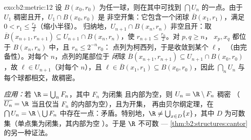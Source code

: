 \begin{solution}{exo:b2:metric:12}
设 $B(x_0, r_0)$ 为任一球，则在其中可找到 $\bigcap U_n$
的一点。由于 $U_1$ 稠密且开，$U_1 \cap B(x_0, r_0)$ 是
非空开集：它包含一个闭球 $\overline B(x_1,
r_1)$，满足 $0 < r_1 \leq \frac{r_0}2$（缩小半径）。
归纳地，$U_{n+1} \cap B(x_n, r_n)$ 非空且开：取
$\overline B(x_{n+1}, r_{n+1}) \subseteq U_{n+1} \cap B(x_n,
r_n)$，使 $r_{n+1} \leq \frac{r_n}2$。对 $p, q \geq n$，
$x_p, x_q$ 都位于 $B(x_n, r_n)$ 中，且 $r_n \leq 2^{-n}r_0$：
点列为柯西列，于是收敛到某个 $\ell$，
（由完备性）。对每个 $n$，点列的尾部位于
\emph{闭}球 $\overline B(x_{n+1}, r_{n+1}) \subseteq U_{n+1}
\cap B(x_0, r_0)$，故 $\ell \in U_{n+1}$（对每个 $n$），且 $\ell
\in \overline B(x_1, r_1) \subseteq B(x_0, r_0)$，因此
$\bigcap_n U_n$ 与每个球都相交，故稠密。

\emph{应用：}若 $\R = \bigcup_n F_n$，其中 $F_n$ 为闭集
且内部为空，则 $U_n = \R \setminus F_n$ 稠密
（$\overline{U_n} = \R$ 当且仅当 $F_n$ 的内部为空），且为开集，
再由贝尔纲定理，在 $\bigcap U_n = \R \setminus \bigcup
F_n$ 中存在一点：矛盾。特别地，$\R \neq \bigcup_{x \in D}
\{x\}$，其中 $D$ 为可数集（单点集为闭集，其内部为空
）。于是 $\R$ 不可数 ---
\cref{thm:b2:structures:cantor}的另一种证法。
\end{solution}

